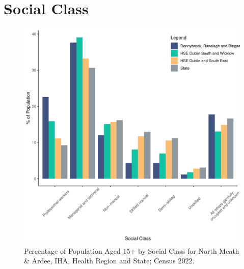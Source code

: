 \documentclass{article}
\begin{document}
\section{Social Class}\label{sect:SC}
\begin{figure}[H]
	\centering
	\includegraphics[width = 140mm]{../figures/SocialClassED.pdf}
	\caption{Percentage of Population Aged 15+ by Social Class for North Meath & Ardee, IHA, Health Region and State; Census 2022.}
	\label{fig:vbnv}
	\end{figure}
\end{document}
